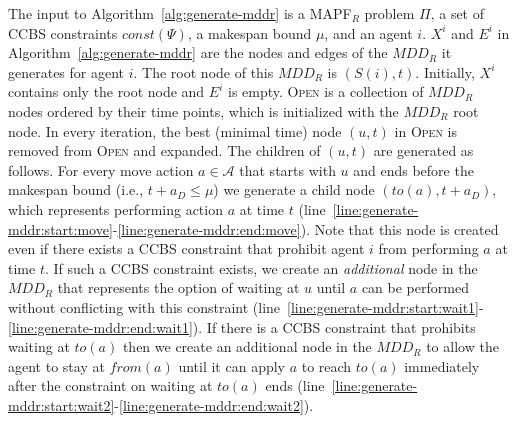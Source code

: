 \documentclass[review]{elsarticle}
\newcommand{\mddr}{\ensuremath{MDD_R}\xspace}
\newcommand{\source}{\ensuremath{S}\xspace}
\newcommand{\fromv}{\ensuremath{\mathit{from}}\xspace}
\newcommand{\tov}{\ensuremath{\mathit{to}}\xspace}
\newcommand\konstantin[1]{\nb{\textbf{Konstantin:}}{red}{#1}}
\newcommand\roni[1]{\nb{\textbf{Roni:}}{green}{#1}}
\newcommand{\ccbs}{\ac{CCBS}\xspace}
\newcommand{\csipp}{\ac{CSIPP}\xspace}
\newcommand{\mapfr}{\ac{MAPF}$_R$\xspace}
\newcommand{\musmtccbs}{\ensuremath{\mu}SMT-CCBS\xspace}
\newcommand{\const}{\textit{const}\xspace}
\newcommand{\OPEN}{\textsc{Open}\xspace}
\begin{document}

The input to Algorithm~\ref{alg:generate-mddr} is a \mapfr problem $\Pi$, 
a set of \ccbs constraints $\const(\Psi)$, 
a makespan bound $\mu$, 
and an agent $i$.  
$X^i$ and $E^i$ in Algorithm~\ref{alg:generate-mddr} are the nodes and edges of the \mddr it generates for agent $i$. 
The root node of this \mddr is $(\source(i),t)$. 
Initially, $X^i$ contains only the root node and $E^i$ is empty. 
\OPEN is a collection %
of \mddr nodes ordered by their time points, 
which is initialized with the \mddr root node. 
In every iteration, the best (minimal time) node $(u,t)$ in \OPEN is removed from \OPEN and expanded. 
The children of $(u,t)$ are generated as follows. 
For every move action $a\in \mathcal{A}$ that starts with $u$ and ends before the makespan bound (i.e., $t+a_D\leq \mu$) 
we generate a child node $(\tov(a),t+a_D)$, which represents performing action $a$ at time $t$ (line~\ref{line:generate-mddr:start:move}-\ref{line:generate-mddr:end:move}). 
Note that this node is created even if there exists a \ccbs constraint that prohibit agent $i$ from performing $a$ at time $t$. 
If such a \ccbs constraint exists, we create an \emph{additional} node in the \mddr that represents the option of waiting at $u$ until $a$ can be performed without conflicting with this constraint (line~\ref{line:generate-mddr:start:wait1}-\ref{line:generate-mddr:end:wait1}). 
If there is a \ccbs constraint that prohibits waiting at $\tov(a)$ then we create an additional node in the \mddr to allow the agent to stay at $\fromv(a)$ until it can apply $a$ to reach $\tov(a)$ immediately after the constraint on waiting at $\tov(a)$ ends (line~\ref{line:generate-mddr:start:wait2}-\ref{line:generate-mddr:end:wait2}). 
\end{document}
